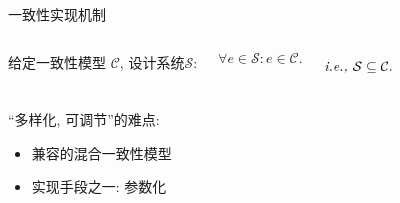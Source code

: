 \begin{frame}{一致性实现机制}
  \begin{columns}
	  \begin{center}
		给定一致性模型 $\mathcal{C}$, 设计系统$\mathcal{S}$:
	  \end{center}

	  \[
		\forall e \in \mathcal{S}: e \in \mathcal{C}.
	  \]

	  \[
		\textrm{\it i.e., } \mathcal{S} \subseteq \mathcal{C}.
	  \]
  \end{columns}

  \pause
  \vspace{0.40cm}

  \begin{columns}
	  \begin{center}
		``多样化, 可调节''的难点:
		\begin{itemize}
		  \centering
		  \item 兼容的混合一致性模型
		  \item 实现手段之一: 参数化
		\end{itemize}
	  \end{center}
  \end{columns}
\end{frame}
